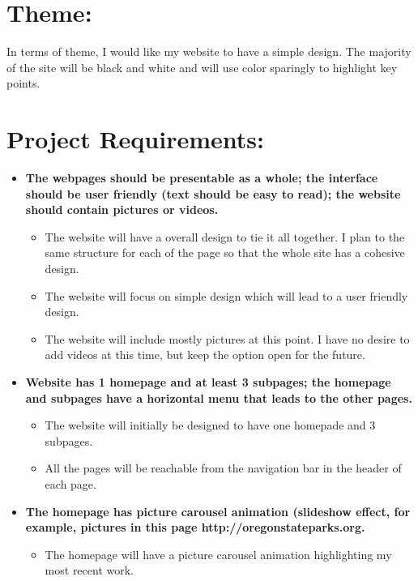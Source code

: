 \documentclass{article}
\begin{document}
\section*{Theme:}

In terms of theme, I would like my website to have a simple design. The majority of the site will be black and white and will use color sparingly to highlight key points. 

\newpage
\section*{Project Requirements:}

\begin{itemize}[leftmargin=1cm]
	\item \textbf{The webpages should be presentable as a whole; the interface should be user friendly (text should be easy to read); the website should contain pictures or videos.}
	\begin{itemize}
        \item The website will have a overall design to tie it all together. I plan to the same structure for each of the page so that the whole site has a cohesive design. 
        \item The website will focus on simple design which will lead to a user friendly design.
        \item The website will include mostly pictures at this point. I have no desire to add videos at this time, but keep the option open for the future.
    \end{itemize}
	
    \item \textbf{Website has 1 homepage and at least 3 subpages; the homepage and subpages have a horizontal menu that leads to the other pages.}
	\begin{itemize}
        \item The website will initially be designed to have one homepade and 3 subpages. 
        \item All the pages will be reachable from the navigation bar in the header of each page.
    \end{itemize}

    \item \textbf{The homepage has picture carousel animation (slideshow effect, for example, pictures in this page http://oregonstateparks.org.}
    \begin{itemize}
        \item The homepage will have a picture carousel animation highlighting my most recent work. 
    \end{itemize}


\end{itemize}
\end{document}
